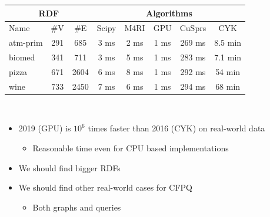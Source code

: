 \documentclass[a0paper,portrait]{baposter}
\begin{document}
\begin{poster}
{\begin{minipage}[t]{0.5\textwidth}
\vspace{-0.1cm}

\begin{tabular}{| p{1.5cm} | c | c | c | c | c | c | c |}
    \hline
    \multicolumn{3}{|c|}{RDF}        & \multicolumn{5}{|c|}{Algorithms}  \\
    \hline
    Name                               & \#V & \#E  & Scipy & M4RI & GPU & CuSprs & CYK \\ %
    \hline
    \hline
    {atm-prim}                    & 291 & 685  & 3 ms     &  2 ms    & 1 ms      & 269 ms  & 8.5 min  \\
    {biomed}                      & 341 & 711  & 3 ms     &  5 ms    & 1 ms      & 283 ms  & 7.1 min  \\
    {pizza}                       & 671 & 2604 & 6 ms     &  8 ms    & 1 ms      & 292 ms  & 54 min \\
    {wine}                        & 733 & 2450 & 7 ms     &  6 ms    & 1 ms      & 294 ms  & 68 min \\
    \hline
  \end{tabular}

\end{minipage}
~
\begin{minipage}[t]{0.48\textwidth}
  \begin{itemize}
    \item 2019 (GPU) is $10^6$ times faster than 2016 (CYK) on real-world data
    \begin{itemize}
       \item Reasonable time even for CPU based implementations
    \end{itemize}
    \item We should find bigger RDFs
    \item We should find other real-world cases for CFPQ
    \begin{itemize}
       \item Both graphs and queries
    \end{itemize}

  \end{itemize}
\end{minipage}
}

\setlength{\tabcolsep}{5pt}
\end{poster}
\end{document}
